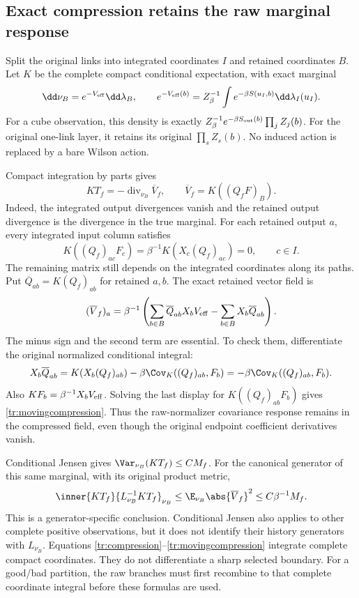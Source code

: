 \subsection{Exact compression retains the raw marginal response}

Split the original links into integrated coordinates \(I\) and retained
coordinates \(B\). Let \(K\) be the complete compact conditional expectation,
with exact marginal
\begin{equation}
 \dd\nu_B=e^{-V_{\rm eff}}\dd\lambda_B,\qquad
 e^{-V_{\rm eff}(b)}
   =Z_\beta^{-1}\int e^{-\beta S(u_I,b)}\dd\lambda_I(u_I).
 \label{tr:rawmarginal}
\end{equation}
For a cube observation, this density is exactly
\(Z_\beta^{-1}e^{-\beta S_{\rm out}(b)}\prod_jZ_j(b)\).
For the original one-link layer, it retains its original \(\prod_sZ_s(b)\).
No induced action is replaced by a bare Wilson action.

Compact integration by parts gives
\begin{equation}
 KT_f=-\operatorname{div}_{\nu_B}\overline V_f,\qquad
 \overline V_f=K((Q_fF)_B).
 \label{tr:compression}
\end{equation}
Indeed, the integrated output divergences vanish and the retained output
divergence is the divergence in the true marginal. For each retained output
\(a\), every integrated input column satisfies
\[
 K((Q_f)_{ac}F_c)=\beta^{-1}K(X_c(Q_f)_{ac})=0,
 \qquad c\in I.
\]
The remaining matrix still depends on the integrated coordinates along its
paths. Put \(\overline Q_{ab}=K(Q_f)_{ab}\) for retained \(a,b\). The exact
retained vector field is
\begin{equation}
 (\overline V_f)_a
  =\beta^{-1}\left(
     \sum_{b\in B}\overline Q_{ab}X_bV_{\rm eff}
       -\sum_{b\in B}X_b\overline Q_{ab}\right).
 \label{tr:movingcompression}
\end{equation}
The minus sign and the second term are essential. To check them, differentiate
the original normalized conditional integral:
\[
 X_b\overline Q_{ab}
 =K(X_b(Q_f)_{ab})-\beta\Cov_K((Q_f)_{ab},F_b)
 =-\beta\Cov_K((Q_f)_{ab},F_b).
\]
Also \(KF_b=\beta^{-1}X_bV_{\rm eff}\). Solving the last display for
\(K((Q_f)_{ab}F_b)\) gives \eqref{tr:movingcompression}. Thus the
raw-normalizer covariance response remains in the compressed field, even
though the original endpoint coefficient derivatives vanish.

Conditional Jensen gives \(\Var_{\nu_B}(KT_f)\le CM_f\).
For the canonical generator of this same marginal, with its original product
metric,
\begin{equation}
 \inner{KT_f}{L_{\nu_B}^{-1}KT_f}_{\nu_B}
  \le\E_{\nu_B}\abs{\overline V_f}^2
  \le C\beta^{-1}M_f.
 \label{tr:compressedinverse}
\end{equation}
This is a generator-specific conclusion. Conditional Jensen also applies to
other complete positive observations, but it does not identify their history
generators with \(L_{\nu_B}\). Equations
\eqref{tr:compression}--\eqref{tr:movingcompression} integrate complete
compact coordinates. They do not differentiate a sharp selected boundary.
For a good/bad partition, the raw branches must first recombine to that
complete coordinate integral before these formulas are used.


